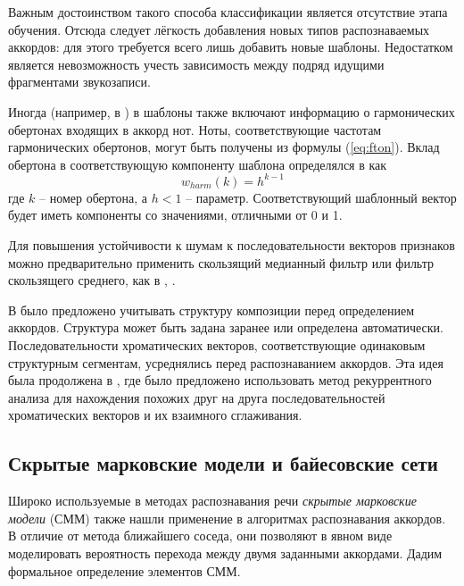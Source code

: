 Важным достоинством такого способа классификации является отсутствие этапа
обучения. Отсюда следует лёгкость добавления новых типов распознаваемых
аккордов: для этого требуется всего лишь добавить новые шаблоны. Недостатком
является невозможность учесть зависимость между подряд идущими фрагментами
звукозаписи.

Иногда (например, в \cite{Oudre2009}) в шаблоны также включают информацию о
гармонических обертонах входящих в аккорд нот. Ноты, соответствующие частотам
гармонических обертонов, могут быть получены из формулы (\ref{eq:fton}). Вклад
обертона в соответствующую компоненту шаблона определялся в \cite{Gomez2006} как
\begin{equation} \label{eq:templates_harmonics}
w_{harm}(k) = h^{k-1}
\end{equation}
где $k$ -- номер обертона, а $h < 1$ -- параметр. Соответствующий шаблонный
вектор будет иметь компоненты со значениями, отличными от 0 и 1.

Для повышения устойчивости к шумам к последовательности векторов признаков
можно предварительно применить скользящий медианный фильтр или фильтр
скользящего среднего, как в \cite{Lee2006}, \cite{Oudre2009}. 

В \cite{Mauch2009} было предложено учитывать структуру композиции перед
определением аккордов. Структура может быть задана заранее или определена
автоматически. Последовательности хроматических векторов, соответствующие
одинаковым структурным сегментам, усреднялись перед распознаванием аккордов. Эта
идея была продолжена в \cite{Cho2011}, где было предложено использовать метод
рекуррентного анализа для нахождения похожих друг на друга последовательностей
хроматических векторов и их взаимного сглаживания.

\subsection{Скрытые марковские модели и байесовские сети}

Широко используемые в методах распознавания речи \emph{скрытые марковские
модели} (СММ) \cite{Rabiner1989} также нашли применение в алгоритмах
распознавания аккордов. В отличие от метода ближайшего соседа, они позволяют в
явном виде моделировать вероятность перехода между двумя заданными аккордами.
Дадим формальное определение элементов СММ.

